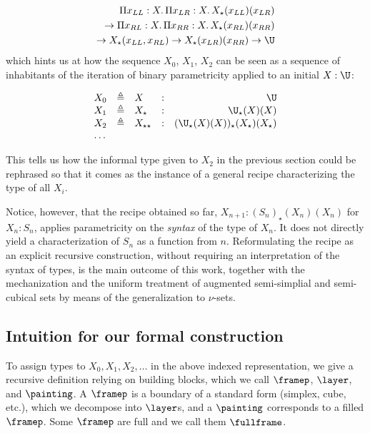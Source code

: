 \documentclass[10pt]{art.cls/art}
\newcommand{\defeq}{\ensuremath{\triangleq}}
\newcommand{\kstar}{{\star}}
\begin{document}
\begin{align*}
  \Pi x_{LL}: X.\, \Pi x_{LR}: X.\, X_\kstar(x_{LL})(x_{LR})             \\
  \rightarrow \Pi x_{RL}: X.\, \Pi x_{RR}: X.\, X_\kstar(x_{RL})(x_{RR}) \\ \rightarrow X_\kstar(x_{LL}, x_{RL}) \rightarrow X_\kstar(x_{LR})(x_{RR})  \rightarrow \U
\end{align*}
which hints us at how the sequence $X_0$, $X_1$, $X_2$ can be seen as a sequence of inhabitants of the iteration of binary parametricity applied to an initial $X: \U$:

\begin{equation*}
  \begin{array}{llllr}
    X_0 & \defeq & X                & : & \U                                               \\
    X_1 & \defeq & X_\kstar         & : & {\U}_\kstar(X)(X)                                \\
    X_2 & \defeq & X_{\kstar\kstar} & : & ({\U}_\kstar(X)(X))_{\kstar}(X_\kstar)(X_\kstar) \\
    \ldots
  \end{array}
\end{equation*}

This tells us how the informal type given to $X_2$ in the previous section could be rephrased so that it comes as the instance of a general recipe characterizing the type of all $X_i$.

Notice, however, that the recipe obtained so far, $X_{n + 1}: ({S_n})_\kstar(X_n)(X_n)$ for $X_n: S_n$, applies parametricity on the \emph{syntax} of the type of $X_n$. It does not directly yield a characterization of $S_n$ as a function from $n$. Reformulating the recipe as an explicit recursive construction, without requiring an interpretation of the syntax of types, is the main outcome of this work, together with the mechanization and the uniform treatment of augmented semi-simplial and semi-cubical sets by means of the generalization to $\nu$-sets.

\subsection{Intuition for our formal construction}
To assign types to $X_0, X_1, X_2, \ldots$ in the above indexed representation, we give a recursive definition relying on building blocks, which we call $\framep$, $\layer$, and $\painting$. A $\framep$ is a boundary of a standard form (simplex, cube, etc.), which we decompose into $\layer$s, and a $\painting$ corresponds to a filled $\framep$. Some $\framep$ are full and we call them $\fullframe$.
\end{document}
